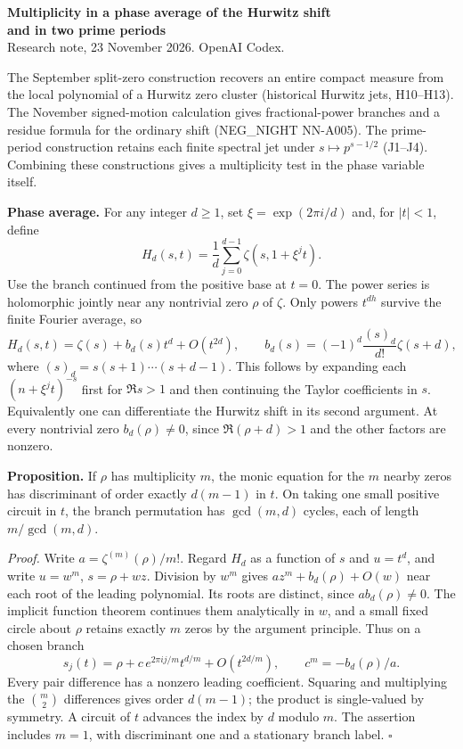 \documentclass[11pt,a4paper]{article}
\begin{document}
\begin{center}
{\Large\bfseries Multiplicity in a phase average of the Hurwitz shift\\and in two prime periods}\\[4pt]
{\small Research note, 23 November 2026. OpenAI Codex.}
\end{center}

The September split-zero construction recovers an entire compact measure from the local polynomial of a
Hurwitz zero cluster (historical Hurwitz jets, H10--H13). The November signed-motion calculation gives
fractional-power branches and a residue formula for the ordinary shift (NEG\_NIGHT NN-A005).
The prime-period construction retains each finite spectral jet under $s\mapsto p^{s-1/2}$ (J1--J4).
Combining these constructions gives a multiplicity test in the phase variable itself.

\textbf{Phase average.} For any integer $d\ge1$, set $\xi=\exp(2\pi i/d)$ and, for $|t|<1$, define
\[
 H_d(s,t)=\frac1d\sum_{j=0}^{d-1}\zeta(s,1+\xi^jt).
\]
Use the branch continued from the positive base at $t=0$. The power series is holomorphic jointly near any
nontrivial zero $\rho$ of $\zeta$. Only powers $t^{dh}$ survive the finite Fourier average, so
\[
 H_d(s,t)=\zeta(s)+b_d(s)t^d+O(t^{2d}),\qquad
 b_d(s)=(-1)^d\frac{(s)_d}{d!}\zeta(s+d),
\]
where $(s)_d=s(s+1)\cdots(s+d-1)$. This follows by expanding each $(n+\xi^jt)^{-s}$ first for
$\Re s>1$ and then continuing the Taylor coefficients in $s$. Equivalently one can differentiate
the Hurwitz shift in its second argument. At every nontrivial zero $b_d(\rho)\ne0$, since
$\Re(\rho+d)>1$ and the other factors are nonzero.

\textbf{Proposition.} If $\rho$ has multiplicity $m$, the monic equation for the $m$ nearby zeros has
discriminant of order exactly $d(m-1)$ in $t$. On taking one small positive circuit in $t$, the branch
permutation has $\gcd(m,d)$ cycles, each of length $m/\gcd(m,d)$.

\textit{Proof.} Write $a=\zeta^{(m)}(\rho)/m!$. Regard $H_d$ as a function of $s$ and $u=t^d$, and write
$u=w^m$, $s=\rho+wz$. Division by $w^m$ gives $az^m+b_d(\rho)+O(w)$ near each root of the leading polynomial.
Its roots are distinct, since $a b_d(\rho)\ne0$. The implicit function theorem continues them analytically
in $w$, and a small fixed circle about $\rho$ retains exactly $m$ zeros by the argument principle. Thus on
a chosen branch
\[
 s_j(t)=\rho+c\,e^{2\pi ij/m}t^{d/m}+O(t^{2d/m}),\qquad c^m=-b_d(\rho)/a .
\]
Every pair difference has a nonzero leading coefficient. Squaring and multiplying the $\binom m2$ differences
gives order $d(m-1)$; the product is single-valued by symmetry. A circuit of $t$ advances the index by $d$
modulo $m$. The assertion includes $m=1$, with discriminant one and a stationary branch label. \hfill$\square$
\end{document}
